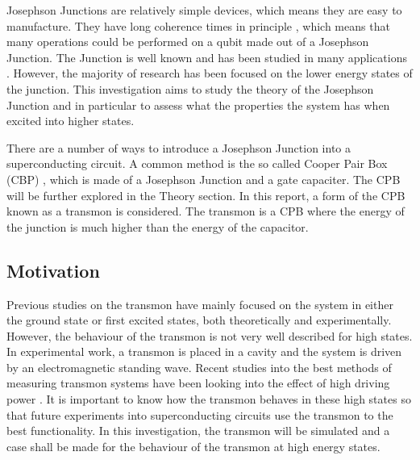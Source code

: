 \documentclass[11pt]{article}
\begin{document}
Josephson Junctions are relatively simple devices, which means they are easy to manufacture. They have long coherence times in principle \cite{paikObservationHighCoherence2011}, which means that many operations could be performed on a qubit made out of a Josephson Junction. The Junction is well known and has been studied in many applications \cite{yuCoherentTemporalOscillations2002,simmondsDecoherenceJosephsonPhase2004}. However, the majority of research has been focused on the lower energy states of the junction. This investigation aims to study the theory of the Josephson Junction and in particular to assess what the properties the system has when excited into higher states.

There are a number of ways to introduce a Josephson Junction into a superconducting circuit. A common method is the so called Cooper Pair Box (CBP) \cite{bladhSingleCooperpairBox2005}, which is made of a Josephson Junction and a gate capaciter. The CPB will be further explored in the Theory section. In this report, a form of the CPB known as a transmon is considered. The transmon is a CPB where the energy of the junction is much higher than the energy of the capacitor. 

\subsection{Motivation}
Previous studies on the transmon have mainly focused on the system in either the ground state or first excited states, both theoretically and experimentally. However, the behaviour of the transmon is not very well described for high states. In experimental work, a transmon is placed in a cavity and the system is driven by an electromagnetic standing wave. Recent studies into the best methods of measuring transmon systems have been looking into the effect of high driving power \cite{reedHighFidelityReadoutCircuit2010}.  It is important to know how the transmon behaves in these high states so that future experiments into superconducting circuits use the transmon to the best functionality. In this investigation, the transmon will be simulated and a case shall be made for the behaviour of the transmon at high energy states.
\end{document}
